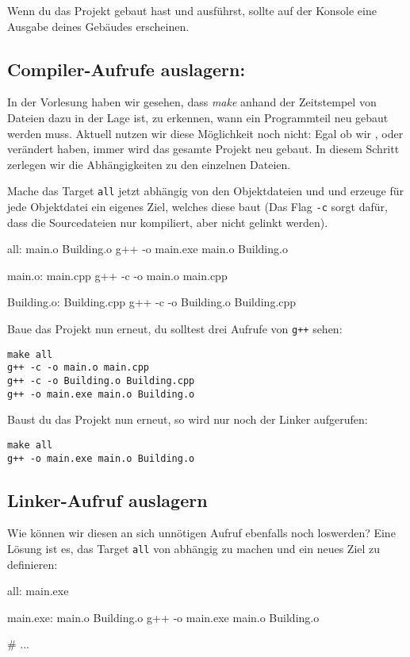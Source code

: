 Wenn du das Projekt gebaut hast und ausführst, sollte auf der Konsole eine Ausgabe deines Gebäudes erscheinen.

\subsection{Compiler-Aufrufe auslagern:}
In der Vorlesung haben wir gesehen, dass \emph{make} anhand der Zeitstempel von Dateien dazu in der Lage ist, zu erkennen, wann ein Programmteil neu gebaut werden muss.
Aktuell nutzen wir diese Möglichkeit noch nicht:
Egal ob wir ,  oder  verändert haben, immer wird das gesamte Projekt neu gebaut.
In diesem Schritt zerlegen wir die Abhängigkeiten zu den einzelnen Dateien.

Mache das Target \texttt{all} jetzt abhängig von den Objektdateien  und  und erzeuge für jede Objektdatei ein eigenes Ziel, welches diese baut (Das Flag \texttt{-c} sorgt dafür, dass die Sourcedateien nur kompiliert, aber nicht gelinkt werden).
\begin{lstmake}
all: main.o Building.o
    g++ -o main.exe main.o Building.o

main.o: main.cpp
    g++ -c -o main.o main.cpp

Building.o: Building.cpp
    g++ -c -o Building.o Building.cpp
\end{lstmake}

Baue das Projekt nun erneut, du solltest drei Aufrufe von \texttt{g++} sehen:
\begin{verbatim}
make all
g++ -c -o main.o main.cpp
g++ -c -o Building.o Building.cpp
g++ -o main.exe main.o Building.o
\end{verbatim}
Baust du das Projekt nun erneut, so wird nur noch der Linker aufgerufen:
\begin{verbatim}
make all
g++ -o main.exe main.o Building.o
\end{verbatim}

\subsection{Linker-Aufruf auslagern}
Wie können wir diesen an sich unnötigen Aufruf ebenfalls noch loswerden?
Eine Lösung ist es, das Target \texttt{all} von  abhängig zu machen und ein neues Ziel  zu definieren:
\begin{lstmake}
all: main.exe

main.exe: main.o Building.o
    g++ -o main.exe main.o Building.o

# ...
\end{lstmake}

